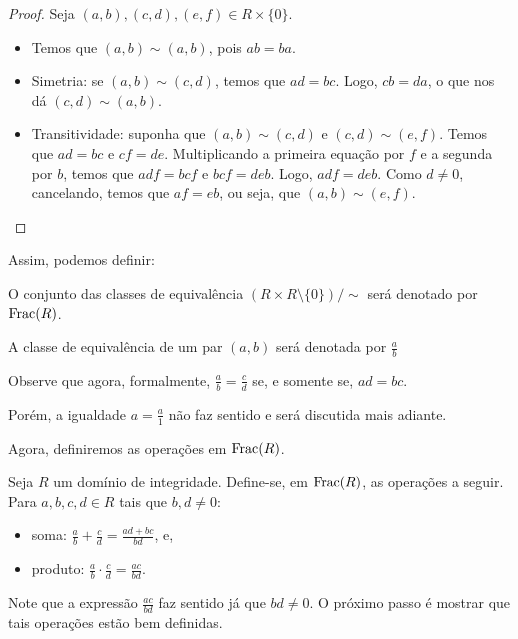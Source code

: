 \begin{proof}
    Seja $(a, b), (c, d), (e, f) \in R\times \{0\}$.
    \begin{itemize}
        \item Temos que $(a, b)\sim (a, b)$, pois $ab=ba$.
        \item Simetria: se $(a, b)\sim (c, d)$, temos que $ad=bc$.
        Logo, $cb=da$, o que nos dá $(c, d)\sim (a, b)$.
        \item Transitividade: suponha que $(a, b)\sim (c, d)$ e $(c, d)\sim (e, f)$.
        Temos que $ad=bc$ e $cf=de$.
        Multiplicando a primeira equação por $f$ e a segunda por $b$, temos que $adf=bcf$ e $bcf=deb$.
        Logo, $adf=deb$.
        Como $d\neq 0$, cancelando, temos que $af=eb$, ou seja, que $(a, b)\sim (e, f)$.
    \end{itemize}
\end{proof}
Assim, podemos definir:

\begin{definition}
    O conjunto das classes de equivalência $(R\times R\setminus\{0\})/\sim$ será denotado por $\operatorname{Frac}(R)$.
    
    A classe de equivalência de um par $(a, b)$ será denotada por $\frac{a}{b}$
\end{definition}

Observe que agora, formalmente, $\frac{a}{b}=\frac{c}{d}$ se, e somente se, $ad=bc$.

Porém, a igualdade $a=\frac{a}{1}$ não faz sentido e será discutida mais adiante.

Agora, definiremos as operações em $\operatorname{Frac}(R)$.

\begin{definition}
    Seja $R$ um domínio de integridade. Define-se, em $\operatorname{Frac}(R)$, as operações a seguir. Para $a, b, c, d \in R$ tais que $b, d\neq 0$:
    \begin{itemize}
        \item soma: $\displaystyle\frac{a}{b}+\frac{c}{d}=\frac{ad+bc}{bd}$, e,
        \item produto: $\displaystyle\frac{a}{b}\cdot\frac{c}{d}=\frac{ac}{bd}$.
    \end{itemize}
\end{definition}

Note que a expressão $\frac{ac}{bd}$ faz sentido já que $bd\neq 0$.
O próximo passo é mostrar que tais operações estão bem definidas.

